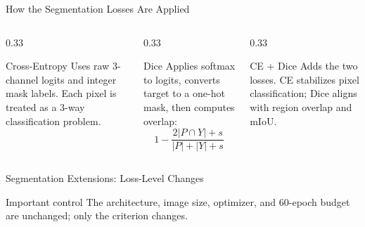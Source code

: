 \documentclass[aspectratio=169,9pt]{beamer}
\begin{document}
\begin{frame}{How the Segmentation Losses Are Applied}
  \begin{columns}[T]
    \begin{column}{0.33\textwidth}
      \begin{block}{Cross-Entropy}
        Uses raw 3-channel logits and integer mask labels. Each pixel is treated as a 3-way classification problem.
      \end{block}
    \end{column}
    \begin{column}{0.33\textwidth}
      \begin{block}{Dice}
        Applies softmax to logits, converts target to a one-hot mask, then computes overlap:
        \[
        1-\frac{2|P\cap Y|+s}{|P|+|Y|+s}
        \]
      \end{block}
    \end{column}
    \begin{column}{0.33\textwidth}
      \begin{block}{CE + Dice}
        Adds the two losses. CE stabilizes pixel classification; Dice aligns with region overlap and mIoU.
      \end{block}
    \end{column}
  \end{columns}
\end{frame}

\begin{frame}{Segmentation Extensions: Loss-Level Changes}
  \centering
  \vspace{0.8em}
  \begin{block}{Important control}
    The architecture, image size, optimizer, and 60-epoch budget are unchanged; only the criterion changes.
  \end{block}
\end{frame}
\end{document}
